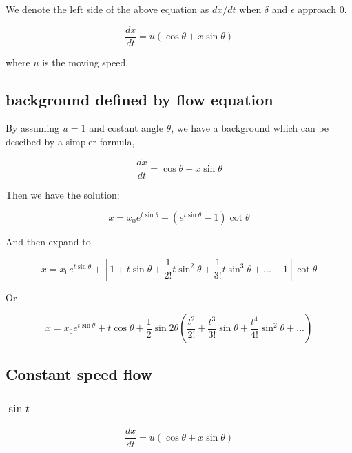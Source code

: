 \documentclass{article}
\begin{document}
We denote the left side of the above equation as $dx / dt$ when $\delta$ and $\epsilon$ approach 0.

\begin{equation}
    \frac{dx}{dt} = u (\cos \theta + x \sin \theta)
    \label{eqn:flow}
\end{equation}

where $u$ is the moving speed.

\subsection{background defined by flow equation}\label{sec:}

By assuming $u = 1$ and costant angle $\theta$, we have a background which can be descibed by a simpler formula,

\begin{equation}
    \frac{dx}{dt} = \cos \theta + x \sin \theta
\end{equation}

Then we have the solution:

\begin{equation}
   x = x_0 e^{t \sin \theta} + (e^{t \sin \theta} - 1) \cot \theta
\end{equation}

And then expand to

\begin{equation}
   x =  x_0 e^{t \sin \theta} + [1 + t \sin \theta + \frac{1}{2!} t\sin^2 \theta  + \frac{1}{3!} t \sin^3 \theta + ... - 1] \cot \theta
\end{equation}

Or

\begin{equation}
   x =  x_0 e^{t \sin \theta} + t \cos \theta + \frac{1}{2} \sin 2\theta (\frac{t^2}{2!} + \frac{t^3}{3!} \sin \theta + \frac{t^4}{4!} \sin^2 \theta + ...)
\end{equation}

\newpage

\subsection{Constant speed flow}\label{sec:csflow}

\subsubsection{$\sin t$}

\begin{equation}
    \frac{dx}{dt} = u (\cos \theta + x \sin \theta)
\end{equation}
\end{document}
